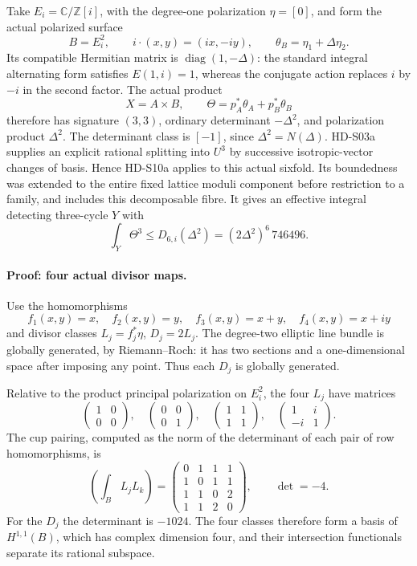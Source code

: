 Take \(E_i=\mathbb C/\mathbb Z[i]\), with the degree-one
polarization \(\eta=[0]\), and form the actual polarized surface
\[
 B=E_i^2,\qquad
 i\cdot(x,y)=(ix,-iy),\qquad
 \theta_B=\eta_1+\Delta\eta_2.
\]
Its compatible Hermitian matrix is
\(\operatorname{diag}(1,-\Delta)\): the standard integral
alternating form satisfies \(E(1,i)=1\), whereas the conjugate
action replaces \(i\) by \(-i\) in the second factor.
The actual product
\[
 X=A\times B,\qquad
 \Theta=p_A^*\theta_A+p_B^*\theta_B
\]
therefore has signature \((3,3)\), ordinary determinant
\(-\Delta^2\), and polarization product \(\Delta^2\).
The determinant class is \([-1]\), since \(\Delta^2=N(\Delta)\).
HD-S03a supplies an explicit rational splitting into \(U^3\)
by successive isotropic-vector changes of basis. Hence HD-S10a
applies to this actual sixfold. Its boundedness was extended to
the entire fixed lattice moduli component before restriction to
a family, and includes this decomposable fibre.
It gives an effective integral detecting three-cycle \(Y\) with
\[
 \int_Y\Theta^3\le
 D_{6,i}(\Delta^2)=(2\Delta^2)^6\,746496.                   \tag{S11.4}
\]

\paragraph{Proof: four actual divisor maps.}
Use the homomorphisms
\[
 f_1(x,y)=x,\quad f_2(x,y)=y,\quad
 f_3(x,y)=x+y,\quad f_4(x,y)=x+iy
\]
and divisor classes \(L_j=f_j^*\eta\), \(D_j=2L_j\).
The degree-two elliptic line bundle is globally generated,
by Riemann--Roch: it has two sections and a one-dimensional
space after imposing any point. Thus each \(D_j\) is globally
generated.

Relative to the product principal polarization on \(E_i^2\),
the four \(L_j\) have matrices
\[
 \begin{pmatrix}1&0\\0&0\end{pmatrix},\quad
 \begin{pmatrix}0&0\\0&1\end{pmatrix},\quad
 \begin{pmatrix}1&1\\1&1\end{pmatrix},\quad
 \begin{pmatrix}1&i\\-i&1\end{pmatrix}.
\]
The cup pairing, computed as the norm of the determinant of
each pair of row homomorphisms, is
\[
 \left(\int_B L_jL_k\right)=
 \begin{pmatrix}
 0&1&1&1\\
 1&0&1&1\\
 1&1&0&2\\
 1&1&2&0
 \end{pmatrix},\qquad \det=-4.                            \tag{S11.5}
\]
For the \(D_j\) the determinant is \(-1024\).
The four classes therefore form a basis of \(H^{1,1}(B)\),
which has complex dimension four, and their intersection
functionals separate its rational subspace.

